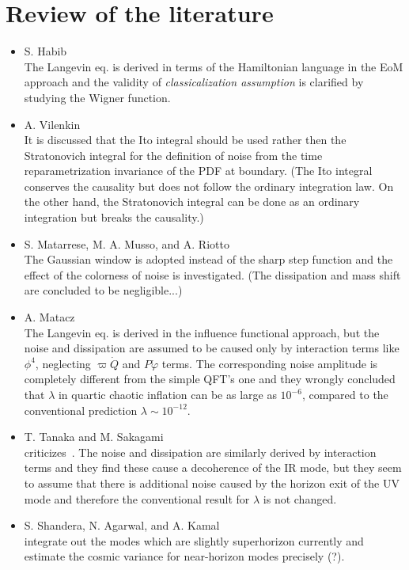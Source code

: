 \documentclass[aps, prd
, preprint
, nofootinbib 
]{revtex4-1}
\begin{document}
\section{Review of the literature}
\begin{itemize}
\item[\cite{Habib:1992ci}] S. Habib \\
The Langevin eq. is derived in terms of the Hamiltonian language in the EoM approach and
the validity of \emph{classicalization assumption} is clarified by studying the Wigner function.

\item[\cite{Vilenkin:1999kd}] A. Vilenkin\\ 
It is discussed that the Ito integral should be used rather then the Stratonovich integral for the definition of noise
from the time reparametrization invariance of the PDF at boundary. (The Ito integral conserves the causality but does not follow the ordinary 
integration law. On the other hand, the Stratonovich integral can be done as an ordinary integration but breaks the causality.)

\item[\cite{Matarrese:2003ye}] S. Matarrese, M. A. Musso, and A. Riotto\\
The Gaussian window is adopted instead of the sharp step function and the effect of the colorness of noise is
investigated. (The dissipation and mass shift are concluded to be negligible...)

\item[\cite{Matacz:1996gk}] A. Matacz \\
The Langevin eq. is derived in the influence functional approach, but the noise and dissipation are assumed to be caused only by interaction terms
like $\phi^4$, neglecting $\varpi\dot{Q}$ and $P\dot{\varphi}$ terms. The corresponding noise amplitude is completely different from the simple QFT's one
and they wrongly concluded that $\lambda$ in quartic chaotic inflation can be as large as $10^{-6}$, 
compared to the conventional prediction $\lambda\sim10^{-12}$.

\item[\cite{Tanaka:1997iy}] T. Tanaka and M. Sakagami \\
criticizes~\cite{Matacz:1996gk}. The noise and dissipation are similarly derived by interaction terms and they find these cause a decoherence of 
the IR mode, but they seem to assume that there is additional noise caused by the horizon exit of the UV mode and therefore 
the conventional result for $\lambda$ is not changed.

\item[\cite{Shandera:2017qkg}] S. Shandera, N. Agarwal, and A. Kamal \\
integrate out the modes which are slightly superhorizon currently and estimate the cosmic variance for near-horizon modes precisely (?).


\end{itemize}










        




\end{document}
